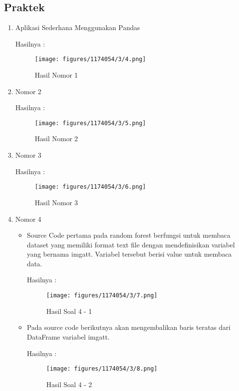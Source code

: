 \subsection{Praktek}
\begin{enumerate}
\item Aplikasi Sederhana Menggunakan Pandas
\hfill\break
	
Hasilnya :
\begin{figure}[H]
		\texttt{[image: figures/1174054/3/4.png]}
		\centering
		\caption{Hasil Nomor 1}
\end{figure}

\item Nomor 2
\hfill\break
	
Hasilnya :
\begin{figure}[H]
		\texttt{[image: figures/1174054/3/5.png]}
		\centering
		\caption{Hasil Nomor 2}
\end{figure}

\item Nomor 3
\hfill\break
	
Hasilnya :
\begin{figure}[H]
		\texttt{[image: figures/1174054/3/6.png]}
		\centering
		\caption{Hasil Nomor 3}
\end{figure}

\item Nomor 4
\hfill\break
\begin{itemize}
\item Source Code pertama pada random forest berfungsi untuk membaca dataset yang memiliki format text file dengan mendefinisikan variabel yang bernama imgatt. Variabel tersebut berisi value untuk membaca data. 

Hasilnya :
\begin{figure}[H]
	\centering
		\texttt{[image: figures/1174054/3/7.png]}
		\caption{Hasil Soal 4 - 1}
\end{figure}
		
\item Pada source code berikutnya akan mengembalikan baris teratas dari DataFrame variabel imgatt.

Hasilnya :
\begin{figure}[H]
	\centering
		\texttt{[image: figures/1174054/3/8.png]}
		\caption{Hasil Soal 4 - 2}
\end{figure}
		

\end{itemize}
\end{enumerate}
